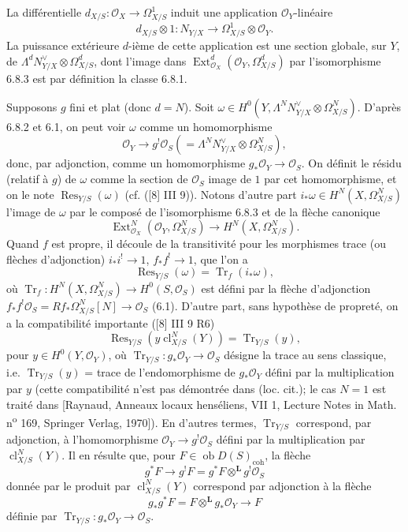 \documentclass[11pt]{article}
\DeclareMathOperator{\Ext}{Ext}
\newcommand{\ob}{\operatorname{ob}}
\providecommand{\cl}{\operatorname{cl}}
\providecommand{\OO}{\mathcal{O}}
\providecommand{\LL}{\mathbf L}
\providecommand{\coh}{\mathrm{coh}}
\providecommand{\ob}{\operatorname{ob}}
\providecommand{\cl}{\operatorname{cl}}
\begin{document}
La différentielle $d_{X/S}:\OO_X\to\Omega^1_{X/S}$ induit une application $\OO_Y$-linéaire
\[
d_{X/S}\otimes 1:N_{Y/X}\longrightarrow \Omega^1_{X/S}\otimes\OO_Y.
\]
La puissance extérieure $d$-ième de cette application est une section globale, sur $Y$, de $\Lambda^d N_{Y/X}^{\vee}\otimes\Omega^d_{X/S}$, dont l'image dans $\Ext^d_{\OO_X}(\OO_Y,\Omega^d_{X/S})$ par l'isomorphisme 6.8.3 est par définition la classe 6.8.1.

Supposons $g$ fini et plat (donc $d=N$). Soit $\omega\in H^0(Y,\Lambda^N N_{Y/X}^{\vee}\otimes\Omega^N_{X/S})$. D'après 6.8.2 et 6.1, on peut voir $\omega$ comme un homomorphisme
\[
\OO_Y\longrightarrow g^!\OO_S(=\Lambda^N N_{Y/X}^{\vee}\otimes\Omega^N_{X/S}),
\]
donc, par adjonction, comme un homomorphisme $g_*\OO_Y\to\OO_S$. On définit le résidu (relatif à $g$) de $\omega$ comme la section de $\OO_S$ image de $1$ par cet homomorphisme, et on le note $\operatorname{Res}_{Y/S}(\omega)$ (cf. ([8] III 9)). Notons d'autre part $i_*\omega\in H^N(X,\Omega^N_{X/S})$ l'image de $\omega$ par le composé de l'isomorphisme 6.8.3 et de la flèche canonique
\[
\Ext^N_{\OO_X}(\OO_Y,\Omega^N_{X/S})\longrightarrow H^N(X,\Omega^N_{X/S}).
\]
Quand $f$ est propre, il découle de la transitivité pour les morphismes trace (ou flèches d'adjonction) $i_*i^!\to 1$, $f_*f^!\to 1$, que l'on a
\begin{equation}
\tag{6.8.4}
\operatorname{Res}_{Y/S}(\omega)=\operatorname{Tr}_f(i_*\omega),
\end{equation}
où $\operatorname{Tr}_f:H^N(X,\Omega^N_{X/S})\to H^0(S,\OO_S)$ est défini par la flèche d'adjonction $f_*f^!\OO_S=Rf_*\Omega^N_{X/S}[N]\to\OO_S$ (6.1). D'autre part, sans hypothèse de propreté, on a la compatibilité importante ([8] III 9 R6)
\begin{equation}
\tag{6.8.5}
\operatorname{Res}_{Y/S}(y\cl^N_{X/S}(Y))=\operatorname{Tr}_{Y/S}(y),
\end{equation}
pour $y\in H^0(Y,\OO_Y)$, où $\operatorname{Tr}_{Y/S}:g_*\OO_Y\to\OO_S$ désigne la trace au sens classique, i.e. $\operatorname{Tr}_{Y/S}(y)$ = trace de l'endomorphisme de $g_*\OO_Y$ défini par la multiplication par $y$ (cette compatibilité n'est pas démontrée dans (loc. cit.); le cas $N=1$ est traité dans [Raynaud, Anneaux locaux henséliens, VII 1, Lecture Notes in Math. n\textsuperscript{o} 169, Springer Verlag, 1970]). En d'autres termes, $\operatorname{Tr}_{Y/S}$ correspond, par adjonction, à l'homomorphisme $\OO_Y\to g^!\OO_S$ défini par la multiplication par $\cl^N_{X/S}(Y)$. Il en résulte que, pour $F\in\ob D(S)_{\coh}$, la flèche
\begin{equation}
\tag{6.8.6}
g^*F\longrightarrow g^!F=g^*F\otimes^{\LL}g^!\OO_S
\end{equation}
donnée par le produit par $\cl^N_{X/S}(Y)$ correspond par adjonction à la flèche
\begin{equation}
\tag{6.8.7}
g_*g^*F=F\otimes^{\LL}g_*\OO_Y\longrightarrow F
\end{equation}
définie par $\operatorname{Tr}_{Y/S}:g_*\OO_Y\to\OO_S$.
\end{document}
